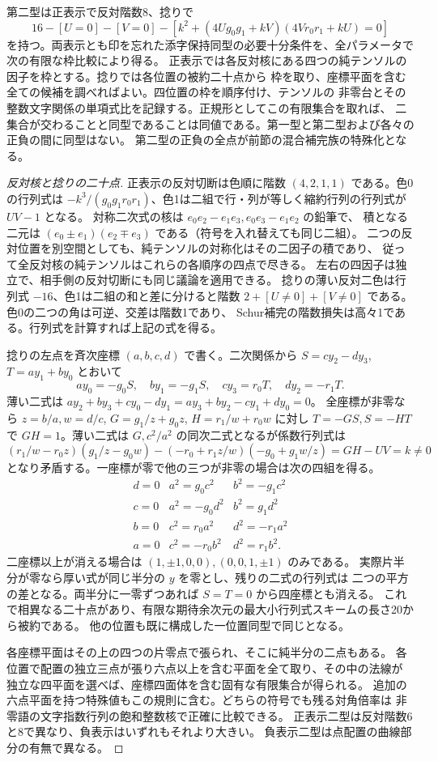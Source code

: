\begin{theorem}\label{thm:double-exchange-frames}
第二型は正表示で反対階数8、捻りで
\[
 16-[U=0]-[V=0]-[k^2+(4Ug_0g_1+kV)(4Vr_0r_1+kU)=0]
\]
を持つ。両表示とも印を忘れた添字保持同型の必要十分条件を、全パラメータで次の有限な枠比較により得る。
正表示では各反対核にある四つの純テンソルの因子を枠とする。捻りでは各位置の被約二十点から
枠を取り、座標平面を含む全ての候補を調べればよい。四位置の枠を順序付け、テンソルの
非零台とその整数文字関係の単項式比を記録する。正規形としてこの有限集合を取れば、
二集合が交わることと同型であることは同値である。第一型と第二型および各々の正負の間に同型はない。
第二型の正負の全点が前節の混合補完族の特殊化となる。
\end{theorem}
\begin{proof}[反対核と捻りの二十点]
正表示の反対切断は色順に階数 $(4,2,1,1)$ である。色0の行列式は
$-k^3/(g_0g_1r_0r_1)$、色1は二組で行・列が等しく縮約行列の行列式が $UV-1$ となる。
対称二次式の核は $e_0 e_2-e_1 e_3,e_0e_3-e_1e_2$ の鉛筆で、
積となる二元は $(e_0\pm e_1)(e_2\mp e_3)$ である（符号を入れ替えても同じ二組）。
二つの反対位置を別空間としても、純テンソルの対称化はその二因子の積であり、
従って全反対核の純テンソルはこれらの各順序の四点で尽きる。
左右の四因子は独立で、相手側の反対切断にも同じ議論を適用できる。
捻りの薄い反対二色は行列式 $-16$、色1は二組の和と差に分けると階数
$2+[U\ne0]+[V\ne0]$ である。色0の二つの角は可逆、交差は階数1であり、
Schur補完の階数損失は高々1である。行列式を計算すれば上記の式を得る。

捻りの左点を斉次座標 $(a,b,c,d)$ で書く。二次関係から
$S=c y_2-d y_3$, $T=a y_1+b y_0$ とおいて
\[
 ay_0=-g_0 S,\quad by_1=-g_1 S,\quad cy_3=r_0T,\quad dy_2=-r_1T .
\]
薄い二式は $ay_2+by_3+cy_0-dy_1=ay_3+by_2-cy_1+dy_0=0$。
全座標が非零なら $z=b/a,w=d/c$, $G=g_1/z+g_0z$, $H=r_1/w+r_0w$ に対し
$T=-GS,S=-HT$ で $GH=1$。薄い二式は $G,c^2/a^2$ の同次二式となるが係数行列式は
\[
 (r_1/w-r_0z)(g_1/z-g_0w)-(-r_0+r_1z/w)(-g_0+g_1w/z)
 =GH-UV=k\ne0
\]
となり矛盾する。一座標が零で他の三つが非零の場合は次の四組を得る。
\[
\begin{array}{c|cc}
d=0 & a^2=g_0c^2& b^2=-g_1c^2\\
c=0 & a^2=-g_0d^2& b^2=g_1d^2\\
b=0 & c^2=r_0a^2& d^2=-r_1a^2\\
a=0 & c^2=-r_0b^2& d^2=r_1b^2 .
\end{array}
\]
二座標以上が消える場合は $(1,\pm1,0,0),(0,0,1,\pm1)$ のみである。
実際片半分が零なら厚い式が同じ半分の $y$ を零とし、残りの二式の行列式は
二つの平方の差となる。両半分に一零ずつあれば $S=T=0$ から四座標とも消える。
これで相異なる二十点があり、有限な期待余次元の最大小行列式スキームの長さ20から被約である。
他の位置も既に構成した一位置同型で同じとなる。

各座標平面はその上の四つの片零点で張られ、そこに純半分の二点もある。
各位置で配置の独立三点が張り六点以上を含む平面を全て取り、その中の法線が
独立な四平面を選べば、座標四面体を含む固有な有限集合が得られる。
追加の六点平面を持つ特殊値もこの規則に含む。どちらの符号でも残る対角倍率は
非零語の文字指数行列の飽和整数核で正確に比較できる。
正表示二型は反対階数6と8で異なり、負表示はいずれもそれより大きい。
負表示二型は点配置の曲線部分の有無で異なる。
\end{proof}

